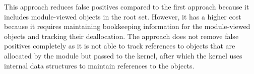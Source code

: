 This approach reduces false positives compared to the first approach because it includes module-viewed objects in the root set. However, it has a higher cost because it requires maintaining bookkeeping information for the module-viewed objects and tracking their deallocation. The approach does not remove false positives completely as it is not able to track references to objects that are allocated by the module but passed to the kernel, after which the kernel uses internal data structures to maintain references to the objects.








